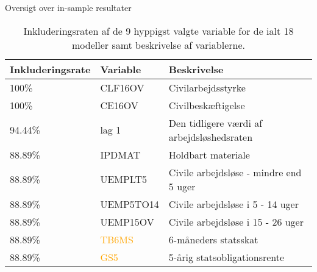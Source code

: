 \begin{frame}{Oversigt over in-sample resultater}
\begin{table}[ht] 
\centering 
\begin{tabular}{lll}
\toprule 
Inkluderingsrate & Variable & Beskrivelse \\ \midrule
100\% &\textcolor{blue3}{CLF16OV} & Civilarbejdsstyrke \\
100\% &\textcolor{blue3}{CE16OV} & Civilbeskæftigelse \\
94.44\% & \textcolor{blue3}{lag 1} & Den tidligere værdi af arbejdsløshedsraten \\
88.89\% & \textcolor{chartreuse4}{IPDMAT} & Holdbart materiale  \\
88.89\% & \textcolor{blue3}{UEMPLT5} & Civile arbejdsløse - mindre end 5 uger \\
88.89\% & \textcolor{blue3}{UEMP5TO14}& Civile arbejdsløse i 5 - 14 uger \\
88.89\% & \textcolor{blue3}{UEMP15OV} &  Civile arbejdsløse i 15 - 26 uger  \\
88.89\% & \textcolor{orange}{TB6MS} & 6-måneders statsskat  \\
88.89\% & \textcolor{orange}{GS5} & 5-årig statsobligationsrente \\
\bottomrule
\end{tabular}  
\caption{Inkluderingsraten af de 9 hyppigst valgte variable for de ialt 18 modeller samt beskrivelse af variablerne.}
\end{table} 
\end{frame}


